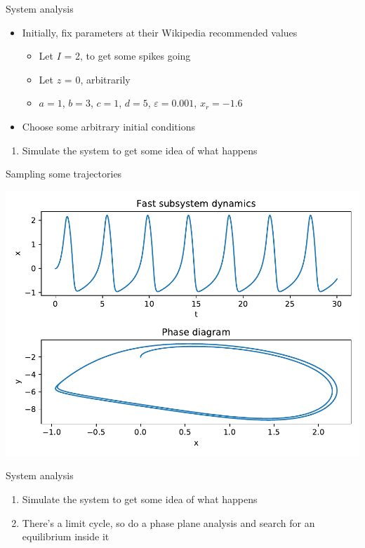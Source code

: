 \documentclass[presentation]{beamer}
\begin{document}
\begin{frame}[label={sec:org0690168}]{System analysis}
\begin{itemize}
\item Initially, fix parameters at their Wikipedia recommended values
\begin{itemize}
\item Let \(I\) = 2, to get some spikes going
\item Let \(z\) = 0, arbitrarily
\item \(a=1\), \(b=3\), \(c=1\), \(d=5\), \(\varepsilon=0.001\), \(x_r=-1.6\)
\end{itemize}
\item Choose some arbitrary initial conditions
\end{itemize}


\begin{enumerate}
\item Simulate the system to get some idea of what happens
\end{enumerate}
\end{frame}

\begin{frame}[label={sec:org1af3bd2}]{Sampling some trajectories}
\begin{center}
\includegraphics[height=.9\textheight]{./trajectory.pdf}
\end{center}
\end{frame}

\begin{frame}[label={sec:orgfe56d1f}]{System analysis}
\begin{enumerate}
\item Simulate the system to get some idea of what happens
\item There's a limit cycle, so do a phase plane analysis and search for an equilibrium inside it
\end{enumerate}
\end{frame}
\end{document}
